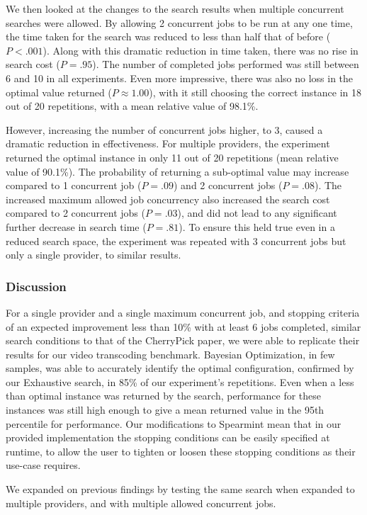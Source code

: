 \documentclass{report}
\begin{document}
We then looked at the changes to the search results when multiple concurrent searches were allowed. By allowing 2 concurrent jobs to be run at any one time, the time taken for the search was reduced to less than half that of before ($P < .001$). Along with this  dramatic reduction in time taken, there was no rise in search cost ($P = .95$). The number of completed jobs performed was still between 6 and 10 in all experiments. Even more impressive, there was also no loss in the optimal value returned ($P \approx 1.00 $), with it still choosing the correct instance in 18 out of 20 repetitions, with a mean relative value of 98.1\%.

However, increasing the number of concurrent jobs higher, to 3, caused a dramatic reduction in effectiveness. For multiple providers, the experiment returned the optimal instance in only 11 out of 20 repetitions (mean relative value of 90.1\%). The probability of returning a sub-optimal value may increase compared to 1 concurrent job ($ P = .09$) and 2 concurrent jobs ($P = .08$). The increased maximum allowed job concurrency also increased the search cost compared to 2 concurrent jobs ($P = .03$), and did not lead to any significant further decrease in search time ($P = .81$). To ensure this held true even in a reduced search space, the experiment was repeated with 3 concurrent jobs but only a single provider, to similar results.

\subsubsection{Discussion}
For a single provider and a single maximum concurrent job, and stopping criteria of an expected improvement less than 10\% with at least 6 jobs completed, similar search conditions to that of the CherryPick paper\cite{Alipourfard2017}, we were able to replicate their results for our video transcoding benchmark. Bayesian Optimization, in few samples, was able to accurately identify the optimal configuration, confirmed by our Exhaustive search, in 85\% of our experiment's repetitions. Even when a less than optimal instance was returned by the search, performance for these instances was still high enough to give a mean returned value in the 95th percentile for performance. Our modifications to Spearmint mean that in our provided implementation the stopping conditions can be easily specified at runtime, to allow the user to tighten or loosen these stopping conditions as their use-case requires.

We expanded on previous findings by testing the same search when expanded to multiple providers, and with multiple allowed concurrent jobs.
\end{document}
